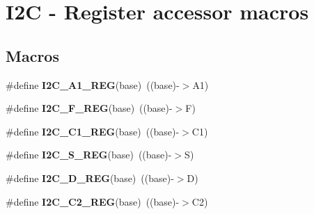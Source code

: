 \hypertarget{group___i2_c___register___accessor___macros}{}\section{I2C -\/ Register accessor macros}
\label{group___i2_c___register___accessor___macros}
\subsection*{Macros}
\begin{DoxyCompactItemize}
\item 
\mbox{\label{group___i2_c___register___accessor___macros_gaa114fe991a3e1e899b53160c91bd8c72}} 
\#define {\bfseries I2\+C\+\_\+\+A1\+\_\+\+R\+EG}(base)~((base)-\/$>$A1)
\item 
\mbox{\label{group___i2_c___register___accessor___macros_ga49a7294fe984b9468681113184d18dfc}} 
\#define {\bfseries I2\+C\+\_\+\+F\+\_\+\+R\+EG}(base)~((base)-\/$>$F)
\item 
\mbox{\label{group___i2_c___register___accessor___macros_gab99b9e99fa2eda1aac30eff81842ce36}} 
\#define {\bfseries I2\+C\+\_\+\+C1\+\_\+\+R\+EG}(base)~((base)-\/$>$C1)
\item 
\mbox{\label{group___i2_c___register___accessor___macros_gaba7d61b90ba883e4e9711a54e4526465}} 
\#define {\bfseries I2\+C\+\_\+\+S\+\_\+\+R\+EG}(base)~((base)-\/$>$S)
\item 
\mbox{\label{group___i2_c___register___accessor___macros_ga0c6f62e67b1d2b8bc2eb7ed0e3a57fbd}} 
\#define {\bfseries I2\+C\+\_\+\+D\+\_\+\+R\+EG}(base)~((base)-\/$>$D)
\item 
\mbox{\label{group___i2_c___register___accessor___macros_ga27c7ad30a1ae595f33d8644b381be049}} 
\#define {\bfseries I2\+C\+\_\+\+C2\+\_\+\+R\+EG}(base)~((base)-\/$>$C2)
\item 
\mbox{\label{group___i2_c___register___accessor___macros_ga3eacf50cc16f3a822d765b681f781d90}} 

\end{DoxyCompactItemize}
